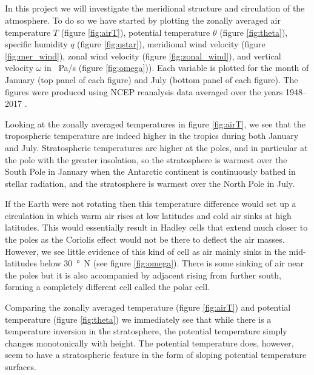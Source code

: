 \documentclass[11pt]{article}
\title{\spacedlowsmallcaps{\small 12.818: Introduction to Atmospheric Data and Large-scale Dynamics}\\ \spacedlowsmallcaps{\Large Project four: The meridional structure of the atmosphere}}
\author{\spacedlowsmallcaps{Ali Ramadhan}}
\date{}
\begin{document}
\maketitle

In this project we will investigate the meridional structure and circulation of the atmosphere. To do so we have started by plotting the zonally averaged air temperature $T$ (figure \ref{fig:airT}), potential temperature $\theta$ (figure \ref{fig:theta}), specific humidity $q$ (figure \ref{fig:qstar}), meridional wind velocity (figure \ref{fig:mer_wind}), zonal wind velocity (figure \ref{fig:zonal_wind}), and vertical velocity $\omega$ in \SI{}{\Pa/s} (figure \ref{fig:omega})). Each variable is plotted for the month of January (top panel of each figure) and July (bottom panel of each figure). The figures were produced using NCEP reanalysis data averaged over the years 1948--2017 \cite{Kalnay}.

Looking at the zonally averaged temperatures in figure \ref{fig:airT}, we see that the tropospheric temperature are indeed higher in the tropics during both January and July. Stratospheric temperatures are higher at the poles, and in particular at the pole with the greater insolation, so the stratosphere is warmest over the South Pole in January when the Antarctic continent is continuously bathed in stellar radiation, and the stratosphere is warmest over the North Pole in July.

If the Earth were not rotating then this temperature difference would set up a circulation in which warm air rises at low latitudes and cold air sinks at high latitudes. This would essentially result in Hadley cells that extend much closer to the poles as the Coriolis effect would not be there to deflect the air masses. However, we see little evidence of this kind of cell as air mainly sinks in the mid-latitudes below \SI{30}{\degree N} (see figure \ref{fig:omega}). There is some sinking of air near the poles but it is also accompanied by adjacent rising from further south, forming a completely different cell called the polar cell.

Comparing the zonally averaged temperature (figure \ref{fig:airT}) and potential temperature (figure \ref{fig:theta}) we immediately see that while there is a temperature inversion in the stratosphere, the potential temperature simply changes monotonically with height. The potential temperature does, however, seem to have a stratospheric feature in the form of sloping potential temperature surfaces.
\end{document}
